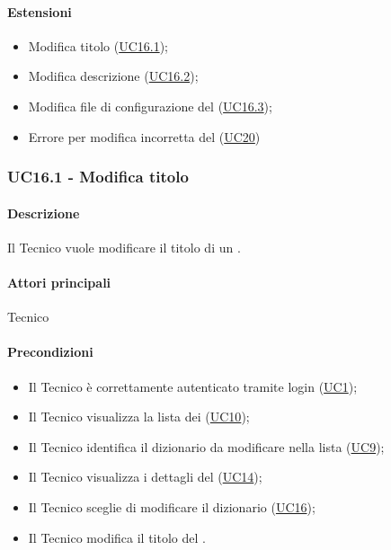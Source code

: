 \paragraph*{Estensioni}
\begin{itemize}
  \item Modifica titolo  (\hyperref[UC16point1]{UC16.1});
  \item Modifica descrizione  (\hyperref[UC16point2]{UC16.2});
  \item Modifica file di configurazione del  (\hyperref[UC16point3]{UC16.3});
  \item Errore per modifica incorretta del  (\hyperref[UC20]{UC20})
\end{itemize}


\subsubsection{UC16.1 - Modifica titolo }\label{UC16point1}
\paragraph*{Descrizione}
Il Tecnico vuole modificare il titolo di un .

\paragraph*{Attori principali}
Tecnico

\paragraph*{Precondizioni}
\begin{itemize}
  \item Il Tecnico è correttamente autenticato tramite login (\hyperref[UC1]{UC1});
  \item Il Tecnico visualizza la lista dei  (\hyperref[UC10]{UC10});
  \item Il Tecnico identifica il dizionario da modificare nella lista (\hyperref[UC9]{UC9});
  \item Il Tecnico visualizza i dettagli del  (\hyperref[UC14]{UC14});
  \item Il Tecnico sceglie di modificare il dizionario (\hyperref[UC16]{UC16});
  \item Il Tecnico modifica il titolo del .
\end{itemize}


